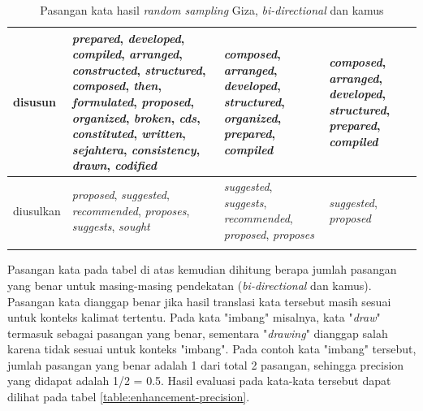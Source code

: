 \begin{longtable}{|p{3cm}|p{3cm}|p{3cm}|p{3cm}|}
		disusun & \textit{prepared}, \textit{developed}, \textit{compiled}, \textit{arranged}, \textit{constructed}, \textit{structured}, \textit{composed}, \textit{then}, \textit{formulated}, \textit{proposed}, \textit{organized}, \textit{broken}, \textit{cds}, \textit{constituted}, \textit{written}, \textit{sejahtera}, \textit{consistency}, \textit{drawn}, \textit{codified} & \textit{composed}, \textit{arranged}, \textit{developed}, \textit{structured}, \textit{organized}, \textit{prepared}, \textit{compiled} & \textit{composed}, \textit{arranged}, \textit{developed}, \textit{structured}, \textit{prepared}, \textit{compiled} \\ \hline
		diusulkan & \textit{proposed}, \textit{suggested}, \textit{recommended}, \textit{proposes}, \textit{suggests}, \textit{sought} & \textit{suggested}, \textit{suggests}, \textit{recommended}, \textit{proposed}, \textit{proposes} & \textit{suggested}, \textit{proposed} \\ \hline
		\caption{Pasangan kata hasil \textit{random sampling} Giza, \textit{bi-directional} dan kamus}
		\label{table:random-sampling-enhancement}
	\end{longtable}

Pasangan kata pada tabel di atas kemudian dihitung berapa jumlah pasangan yang benar untuk masing-masing pendekatan (\textit{bi-directional} dan kamus). Pasangan kata dianggap benar jika hasil translasi kata tersebut masih sesuai untuk konteks kalimat tertentu. Pada kata "imbang" misalnya, kata "\textit{draw}" termasuk sebagai pasangan yang benar, sementara "\textit{drawing}" dianggap salah karena tidak sesuai untuk konteks "imbang". Pada contoh kata "imbang" tersebut, jumlah pasangan yang benar adalah 1 dari total 2 pasangan, sehingga precision yang didapat adalah 1/2 = 0.5. Hasil evaluasi pada kata-kata tersebut dapat dilihat pada tabel \ref{table:enhancement-precision}.


